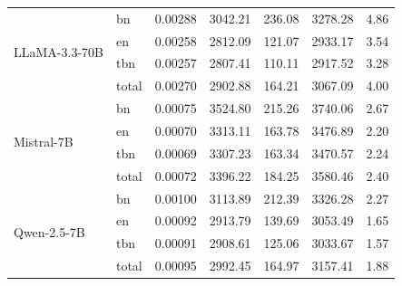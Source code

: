 \documentclass[11pt]{article}
\begin{document}
\begin{table}[h]
{\begin{tabular}{l l l l l l l}
\multirow{4}{*}{LLaMA-3.3-70B} & bn                             & 0.00288           & 3042.21                   & 236.08                    & 3278.28                  & 4.86                       \\
                                    & en                             & 0.00258           & 2812.09                   & 121.07                    & 2933.17                  & 3.54                       \\
                                    & tbn                            & 0.00257           & 2807.41                   & 110.11                    & 2917.52                  & 3.28                       \\
                                    & total                          & 0.00270           & 2902.88                   & 164.21                    & 3067.09                  & 4.00                       \\
\midrule
\multirow{4}{*}{Mistral-7B}         & bn                             & 0.00075           & 3524.80                   & 215.26                    & 3740.06                  & 2.67                       \\
                                    & en                             & 0.00070           & 3313.11                   & 163.78                    & 3476.89                  & 2.20                       \\
                                    & tbn                            & 0.00069           & 3307.23                   & 163.34                    & 3470.57                  & 2.24                       \\
                                    & total                          & 0.00072           & 3396.22                   & 184.25                    & 3580.46                  & 2.40                       \\
\midrule
\multirow{4}{*}{Qwen-2.5-7B}        & bn                             & 0.00100           & 3113.89                   & 212.39                    & 3326.28                  & 2.27                       \\
                                    & en                             & 0.00092           & 2913.79                   & 139.69                    & 3053.49                  & 1.65                       \\
                                    & tbn                            & 0.00091           & 2908.61                   & 125.06                    & 3033.67                  & 1.57                       \\
                                    & total                          & 0.00095           & 2992.45                   & 164.97                    & 3157.41                  & 1.88                       \\


\end{tabular}}
\end{table}
\end{document}
